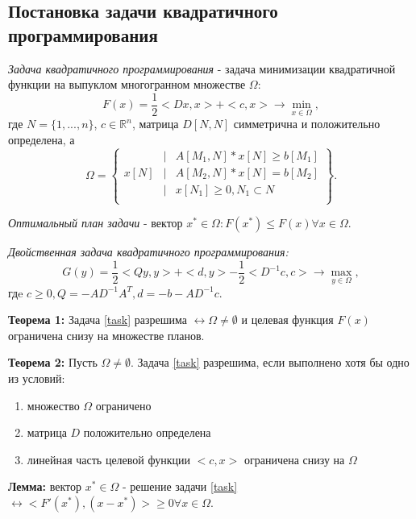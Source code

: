 
\subsection{Постановка задачи квадратичного программирования}
\textit{Задача квадратичного программирования} - задача минимизации квадратичной функции на выпуклом многогранном множестве $\Omega:$
\begin{equation}
    F(x)=\frac{1}{2}<Dx,x>+<c,x>\rightarrow\min_{x\in\Omega},
    \label{task}
\end{equation}
где $N=\{1,...,n\}$, $c\in\mathbb{R}^n$, матрица $D[N,N]$ симметрична и положительно определена, а
\begin{equation}
    \Omega=
    \left\{
    \begin{matrix}
        & | & A[M_1,N]*x[N]\geq b[M_1]\\
        x[N] & | & A[M_2,N]*x[N]=b[M_2]\\
        & | & x[N_1]\geq0,N_1\subset N\\\
    \end{matrix}
    \right\}.
\end{equation}

\textit{Оптимальный план задачи} - вектор  $x^*\in\Omega:F(x^*)\leq F(x)\forall x\in\Omega$.

\textit{Двойственная задача квадратичного программирования:}
\begin{equation}
        G(y)=\frac{1}{2}<Qy,y>+<d,y>-\frac{1}{2}<D^{-1}c,c>\rightarrow\max_{y\in\Omega},
\end{equation}
гдe $c\geq0,Q=-AD^{-1}A^T,d=-b-AD^{-1}c$.

\textbf{Теорема 1:} Задача \eqref{task} разрешима $\leftrightarrow\Omega\not=\emptyset$ и целевая функция $F(x)$ ограничена снизу на множестве планов.

\textbf{Теорема 2:} Пусть $\Omega\not=\emptyset$. Задача \eqref{task} разрешима, если выполнено хотя бы одно из условий:
\begin{enumerate}
    \item множество $\Omega$ ограничено
    \item матрица $D$ положительно определена
    \item линейная часть целевой функции $<c,x>$ ограничена снизу на $\Omega$
\end{enumerate}

\textbf{Лемма:} вектор $x^*\in\Omega$ - решение задачи \eqref{task} $\leftrightarrow<F'(x^*),(x-x^*)>\geq0\forall x\in\Omega$.

